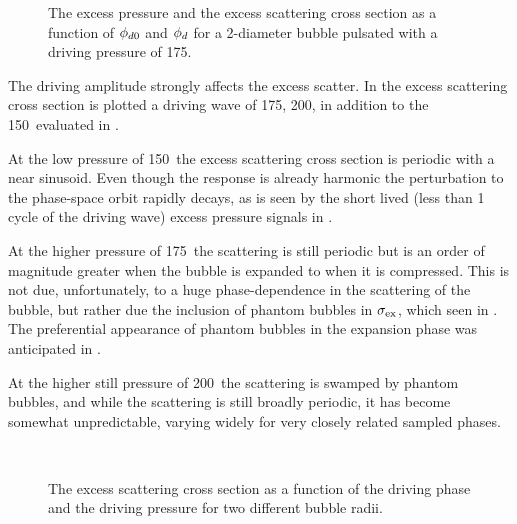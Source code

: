 \begin{figure}
 \centering
 
  \caption{
The excess pressure and the excess scattering cross section as a function of ${\phi_{d0}}$ and ${\phi_d}$
for a \unit{2}\micro\metre-diameter bubble pulsated with a driving pressure of  \unit{175}\kilo\pascal.
  }
 \label{fig:excess_vs_phase_1_75}
\end{figure}

The driving amplitude strongly affects the excess scatter.
In  the excess scattering cross section 
is plotted a driving wave of \unit{175}\kilo\pascal, \unit{200}\kilo\pascal,
in addition to the \unit{150}\kilo\pascal\ evaluated in .

At the low pressure of \unit{150}\kilo\pascal\  the excess scattering cross section is periodic 
with a near sinusoid. 
Even though the response is already  harmonic
the perturbation to the  phase-space orbit rapidly decays,
as is seen by the short lived (less than 1 cycle of the driving wave)
excess pressure signals in .

At the higher pressure of \unit{175}\kilo\pascal\ the scattering is still periodic
but is an order of magnitude greater when the bubble is expanded to when it is compressed.
This is not due, unfortunately, to a huge phase-dependence in the scattering of the bubble,
but rather due the inclusion of phantom bubbles in $\sigma_\textrm{ex}$, which  seen  in .
The preferential appearance of phantom bubbles  in the expansion phase was anticipated in .

At the higher still pressure of \unit{200}\kilo\pascal\ the scattering is swamped by phantom bubbles,
and while the scattering is still broadly periodic, it has become somewhat unpredictable,
varying widely for very closely related sampled phases.




\begin{figure}
 \centering
 \subfloat[$a = \unit{100}\nano\metre$]{
   \label{fig:phase_amp:a}
   }\\
 \subfloat[$a = \unit{1}\micro\metre$]{
   \label{fig:phase_amp:b}
   }
  \caption{
    The excess scattering cross section as a function of the driving phase and the driving pressure
    for two different bubble radii.
  }
 \label{fig:phase_amp}
\end{figure}

